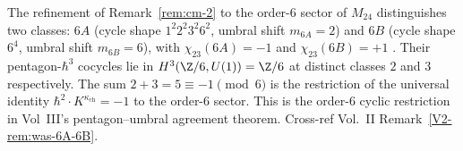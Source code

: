\begin{remark}
\label{rem:cm-M24-order6}
The refinement of Remark~\ref{rem:cm-2} to the order-$6$ sector of
$M_{24}$ distinguishes two classes: $6A$ (cycle shape
$1^2 2^2 3^2 6^2$, umbral shift $m_{6A} = 2$) and $6B$ (cycle shape
$6^4$, umbral shift $m_{6B} = 6$), with $\chi_{23}(6A) = -1$ and
$\chi_{23}(6B) = +1$ \cite{ChengDuncanHarvey2014,ConwayCurtisNortonParkerWilson1985}.
Their pentagon-$\hbar^3$ cocycles lie in $H^3(\Z/6, U(1)) = \Z/6$ at
distinct classes $2$ and $3$ respectively. The sum
$2 + 3 = 5 \equiv -1 \pmod 6$ is the restriction of the universal
identity $\hbar^2 \cdot K^{\kappa_{\mathrm{ch}}} = -1$ to the order-$6$
sector. This is the order-$6$ cyclic restriction in Vol~III's
pentagon--umbral agreement theorem. Cross-ref Vol.~II
Remark~\ref{V2-rem:was-6A-6B}.
\end{remark}
